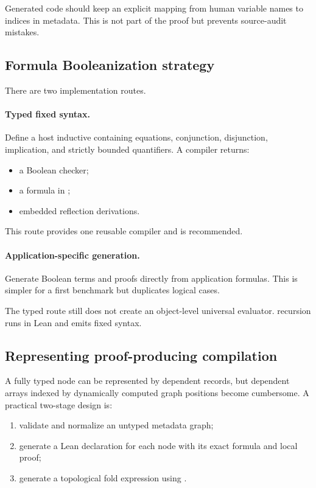 Generated code should keep an explicit mapping from human variable names to  indices in metadata.  This is not part of the proof but prevents source-audit mistakes.

\subsection{Formula Booleanization strategy}

There are two implementation routes.

\paragraph{Typed fixed syntax.}
Define a host inductive  containing equations, conjunction, disjunction, implication, and strictly bounded quantifiers.  A compiler returns:
\begin{itemize}
\item a  Boolean checker;
\item a formula in ;
\item embedded reflection derivations.
\end{itemize}
This route provides one reusable compiler and is recommended.

\paragraph{Application-specific generation.}
Generate Boolean terms and proofs directly from application formulas.  This is simpler for a first benchmark but duplicates logical cases.

The typed route still does not create an object-level universal evaluator.   recursion runs in Lean and emits fixed  syntax.

\subsection{Representing proof-producing compilation}

A fully typed node can be represented by dependent records, but dependent arrays indexed by dynamically computed graph positions become cumbersome.  A practical two-stage design is:

\begin{enumerate}
\item validate and normalize an untyped metadata graph;
\item generate a Lean declaration for each node with its exact formula and local proof;
\item generate a topological fold expression using .
\end{enumerate}

